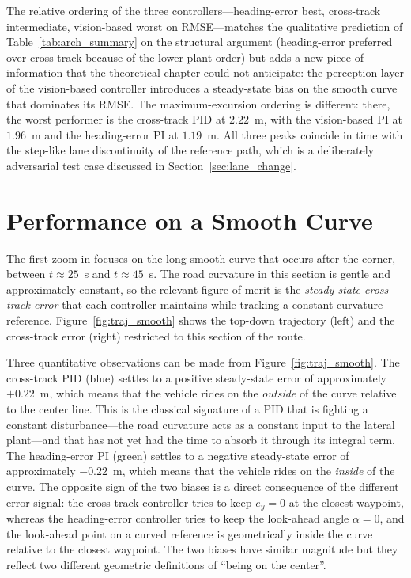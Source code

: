 The relative ordering of the three controllers---heading-error best, cross-track intermediate, vision-based worst on \ac{RMSE}---matches the qualitative prediction of Table~\ref{tab:arch_summary} on the structural argument (heading-error preferred over cross-track because of the lower plant order) but adds a new piece of information that the theoretical chapter could not anticipate: the perception layer of the vision-based controller introduces a steady-state bias on the smooth curve that dominates its \ac{RMSE}. The maximum-excursion ordering is different: there, the worst performer is the cross-track PID at $2.22$~m, with the vision-based PI at $1.96$~m and the heading-error PI at $1.19$~m. All three peaks coincide in time with the step-like lane discontinuity of the reference path, which is a deliberately adversarial test case discussed in Section~\ref{sec:lane_change}.

\section{Performance on a Smooth Curve}
\label{sec:smooth_turn}
The first zoom-in focuses on the long smooth curve that occurs after the corner, between $t \approx 25$~s and $t \approx 45$~s. The road curvature in this section is gentle and approximately constant, so the relevant figure of merit is the \emph{steady-state cross-track error} that each controller maintains while tracking a constant-curvature reference. Figure~\ref{fig:traj_smooth} shows the top-down trajectory (left) and the cross-track error (right) restricted to this section of the route.

Three quantitative observations can be made from Figure~\ref{fig:traj_smooth}. The cross-track PID (blue) settles to a positive steady-state error of approximately $+0.22$~m, which means that the vehicle rides on the \emph{outside} of the curve relative to the center line. This is the classical signature of a PID that is fighting a constant disturbance---the road curvature acts as a constant input to the lateral plant---and that has not yet had the time to absorb it through its integral term. The heading-error PI (green) settles to a negative steady-state error of approximately $-0.22$~m, which means that the vehicle rides on the \emph{inside} of the curve. The opposite sign of the two biases is a direct consequence of the different error signal: the cross-track controller tries to keep $e_y = 0$ at the closest waypoint, whereas the heading-error controller tries to keep the look-ahead angle $\alpha = 0$, and the look-ahead point on a curved reference is geometrically inside the curve relative to the closest waypoint. The two biases have similar magnitude but they reflect two different geometric definitions of \enquote{being on the center}.

